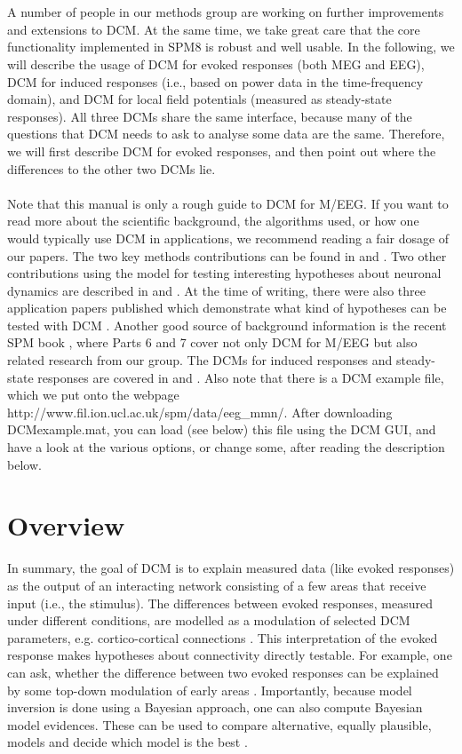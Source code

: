 \\
\\
A number of people in our methods group are working on further
improvements and extensions to DCM. At the same time, we take great
care that the core functionality implemented in SPM8 is robust and
well usable. In the following, we will describe the usage of DCM for evoked
responses (both MEG and EEG), DCM for induced responses (i.e., based
on power data in the time-frequency domain), and DCM for local field
potentials (measured as steady-state responses). All three DCMs share the
same interface, because many of the questions that DCM needs to
ask to analyse some data are the same. Therefore, we will first
describe DCM for evoked responses, and then point out where the
differences to the other two DCMs lie.
\\
\\
Note that this manual is only a rough guide to DCM for
M/EEG. If you want to read more about the scientific background, the
algorithms used, or how one would typically use DCM in applications,
we recommend reading a fair dosage of our papers. The two key methods
contributions can be found in \cite{od_dcm_erp} and
\cite{sjk_dcm_erp}. Two other contributions using the model for
testing interesting hypotheses about neuronal dynamics are described 
in \cite{sjk_dcm_intrinsic} and \cite{matthias_dcm_constraints}. At
the time of writing, there were also three application papers published which demonstrate
what kind of hypotheses can be tested with DCM
\cite{mg_dcm_repro,mg_feedback,marta_mmndcm}. Another good source of
background information is the recent SPM book
\cite{spm_book}, where Parts 6 and 7 cover not only DCM for M/EEG but
also related research from our group. The DCMs for induced responses
and steady-state responses are covered in \cite{cc_induced} and
\cite{rm_spectralnmm,rm_massmodelspectral}. Also note that there is a DCM example file, which we put onto the webpage http://www.fil.ion.ucl.ac.uk/spm/data/eeg\_mmn/. After downloading DCMexample.mat, you can load (see below) this file using the DCM GUI, and have a look at the various options, or change some, after reading the description below.

\section{Overview}
In summary, the goal of DCM is to explain measured data (like evoked
responses) as the output of an interacting network consisting of a few
areas that receive input (i.e., the stimulus). The differences between
evoked responses, measured under different conditions, are modelled as
a modulation of selected DCM parameters, e.g. cortico-cortical
connections \cite{od_dcm_erp}. This interpretation of the evoked
response makes hypotheses about connectivity directly testable. For 
example, one can ask, whether the difference between two
evoked responses can be explained by some top-down modulation of early areas
\cite{mg_dcm_repro}. Importantly, because model inversion is done
using a Bayesian approach, one can also compute Bayesian model evidences. These
can be used to compare alternative, equally plausible, models and
decide which model is the best \cite{stefan_neurodynamics}. 

